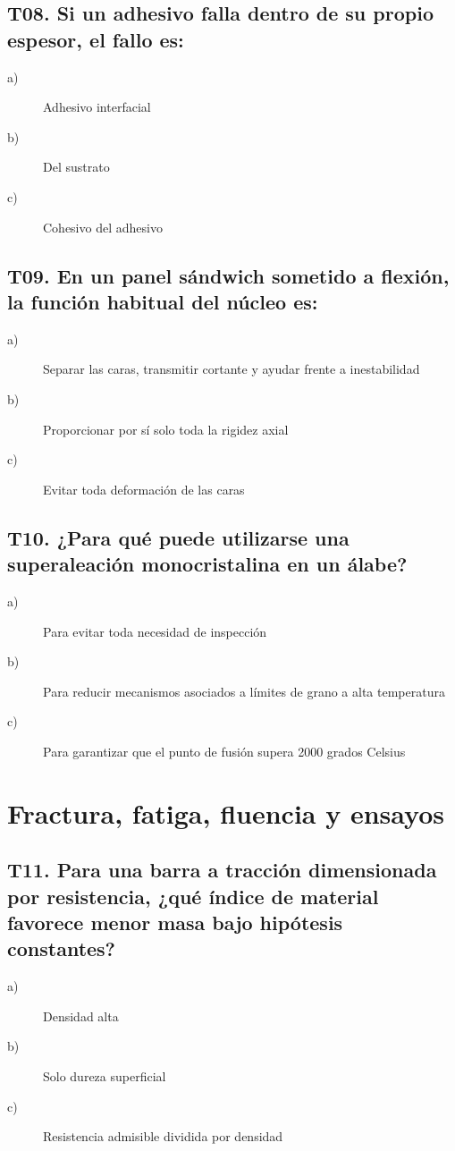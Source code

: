 \subsection*{T08. Si un adhesivo falla dentro de su propio espesor, el fallo es:}
\begin{description}
\item[a)] Adhesivo interfacial
\item[b)] Del sustrato
\item[c)] Cohesivo del adhesivo
\end{description}

\subsection*{T09. En un panel sándwich sometido a flexión, la función habitual del núcleo es:}
\begin{description}
\item[a)] Separar las caras, transmitir cortante y ayudar frente a inestabilidad
\item[b)] Proporcionar por sí solo toda la rigidez axial
\item[c)] Evitar toda deformación de las caras
\end{description}

\subsection*{T10. ¿Para qué puede utilizarse una superaleación monocristalina en un álabe?}
\begin{description}
\item[a)] Para evitar toda necesidad de inspección
\item[b)] Para reducir mecanismos asociados a límites de grano a alta temperatura
\item[c)] Para garantizar que el punto de fusión supera 2000 grados Celsius
\end{description}

\section*{Fractura, fatiga, fluencia y ensayos}
\subsection*{T11. Para una barra a tracción dimensionada por resistencia, ¿qué índice de material favorece menor masa bajo hipótesis constantes?}
\begin{description}
\item[a)] Densidad alta
\item[b)] Solo dureza superficial
\item[c)] Resistencia admisible dividida por densidad
\end{description}

